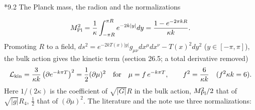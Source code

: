 \documentclass[10pt,a4paper]{article}
\makeatletter
\renewcommand\subsection{\@startsection{subsection}{2}{\z@}{-3.25ex\@plus -1ex \@minus -.2ex}{1.5ex \@plus .2ex}{\normalfont\large\bfseries\raggedright}}
\makeatother
\begin{document}
\subsection*{9.2 The Planck mass, the radion and the normalizations}
\begin{equation*}
M_{\rm Pl}^2=\frac1\kappa\int_{-\pi R}^{\pi R}e^{-2k|y|}dy=\frac{1-e^{-2\pi kR}}{\kappa k} .
\end{equation*}
Promoting $R$ to a field, $ds^2=e^{-2kT(x)|y|}g_{\mu\nu}dx^\mu dx^\nu-T(x)^2dy^2$ ($y\in[-\pi,\pi]$), the bulk action gives the kinetic term (section 26.5; a total derivative removed)
\begin{equation*}
\mathcal L_{\rm kin}=\frac3{\kappa k}\,\big(\partial e^{-k\pi T}\big)^2=\frac12(\partial\mu)^2\quad\text{for}\quad \mu=f\,e^{-k\pi T},\qquad f^2=\frac6{\kappa k}\quad(f^2\kappa k=6).
\end{equation*}
Here $1/(2\kappa)$ is the coefficient of $\sqrt{|G|}R$ in the bulk action, $M_{\rm Pl}^2/2$ that of $\sqrt{|g|}R_4$, $\frac12$ that of $(\partial\mu)^2$. The literature and the note use three normalizations:
\end{document}
